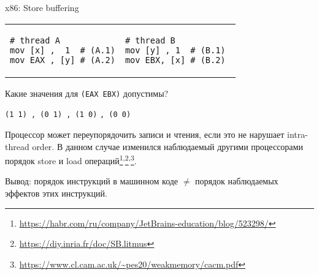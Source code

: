 \begin{frame}{x86: Store buffering}

\begin{tabular}{p{} p{}}
\begin{verbatim}
# thread A
mov [x] ,  1  # (A.1)
mov EAX , [y] # (A.2)
\end{verbatim}

& 

\begin{verbatim}
# thread B          
mov [y] , 1  # (B.1) 
mov EBX, [x] # (B.2) 
\end{verbatim}
\end{tabular}

Какие значения для \texttt{(EAX EBX)} допустимы?

  \texttt{(1 1)\ , (0 1)\ , (1 0)}
\pause
{\color{red} \texttt{, (0 0)}}

\pause
Процессор может переупорядочить записи и чтения, если это не нарушает intra-thread order.
\pause
В данном случае изменился наблюдаемый другими процессорами порядок store и load операций\footnote<4->{\tiny\url{https://habr.com/ru/company/JetBrains-education/blog/523298/}}\textsuperscript{,}\footnote<4->{\tiny\url{https://diy.inria.fr/doc/SB.litmus}}\textsuperscript{,}\footnote<4->{\tiny\url{https://www.cl.cam.ac.uk/~pes20/weakmemory/cacm.pdf}}.

\pause
Вывод: порядок инструкций в машинном коде $\neq$ порядок наблюдаемых эффектов этих инструкций.

\end{frame}


